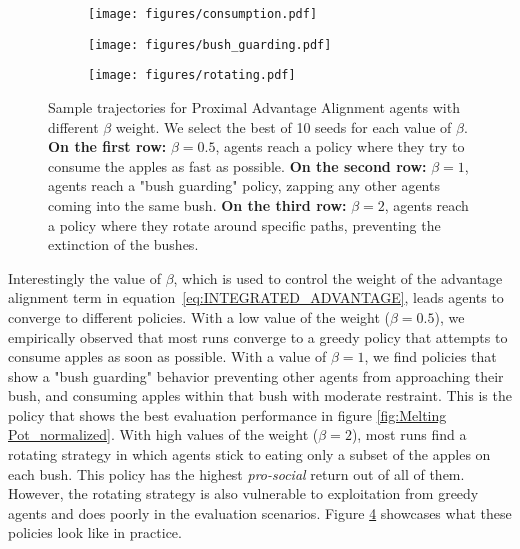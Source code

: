 \documentclass{article} \usepackage{iclr2025_conference,times}
\def\eqref#1{equation~\ref{#1}}
\begin{document}
\begin{figure}[h]
  \centering
  \begin{subfigure}{1\textwidth}
    \centering
    \texttt{[image: figures/consumption.pdf]}
    \label{fig:consumption}
  \end{subfigure}\vspace{-5mm}
  \begin{subfigure}{1\textwidth}
    \centering
    \texttt{[image:  figures/bush\_guarding.pdf]}
    \label{fig:bush_guarding}
  \end{subfigure}\vspace{-5mm}
  \begin{subfigure}{1\textwidth}
    \centering
    \texttt{[image: figures/rotating.pdf]}
    \label{fig:rotating}
  \end{subfigure}
  \caption{Sample trajectories for Proximal Advantage Alignment agents with different $\beta$ weight. We select the best of 10 seeds for each value of $\beta$. \textbf{On the first row:} $\beta = 0.5$, agents reach a policy where they try to consume the apples as fast as possible. \textbf{On the second row:} $\beta = 1$, agents reach a "bush guarding" policy, zapping any other agents coming into the same bush.  \textbf{On the third row:} $\beta = 2$, agents reach a policy where they rotate around specific paths, preventing the extinction of the bushes.}
  \label{fig:Melting Pot_trajectories}
\end{figure}

Interestingly the value of $\beta$, which is used to control the weight of the advantage alignment term in \eqref{eq:INTEGRATED_ADVANTAGE}, leads agents to converge to different policies. With a low value of the weight ($\beta = 0.5$), we empirically observed that most runs converge to a greedy policy that attempts to consume apples as soon as possible. With a value of $\beta = 1$, we find policies that show a "bush guarding" behavior preventing other agents from approaching their bush, and consuming apples within that bush with moderate restraint. This is the policy that shows the best evaluation performance in figure \ref{fig:Melting Pot_normalized}. With high values of the weight ($\beta = 2$), most runs find a rotating strategy in which agents stick to eating only a subset of the apples on each bush. This policy has the highest \textit{pro-social} return out of all of them. However, the rotating strategy is also vulnerable to exploitation from greedy agents and does poorly in the evaluation scenarios. Figure \ref{fig:Melting Pot_trajectories}  showcases what these policies look like in practice. 
\end{document}
